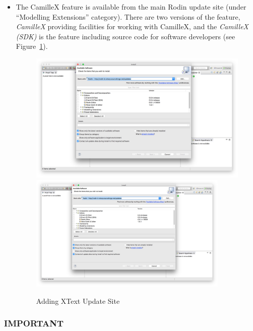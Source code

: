 \begin{itemize}
\item The CamilleX feature is available from the main Rodin update site (under ``Modelling Extensions'' category). There are two versions of the feature, \emph{CamilleX} providing facilities for working with CamilleX, and the \emph{CamilleX (SDK)} is the feature including source code for software developers (see Figure~\ref{fig:EventBXText-installation}).
\begin{figure}[!htbp]
  \centering
  \ifplastex
  \includegraphics[width=512]{figures/EventBXTextInstallation}
  \else
  \includegraphics[width=0.9\textwidth]{figures/EventBXTextInstallation}
  \fi
  \caption{Adding XText Update Site}
  \label{fig:EventBXText-installation}
\end{figure}

\end{itemize}

\subsubsection{IMPORTANT}
\label{sec:important}

